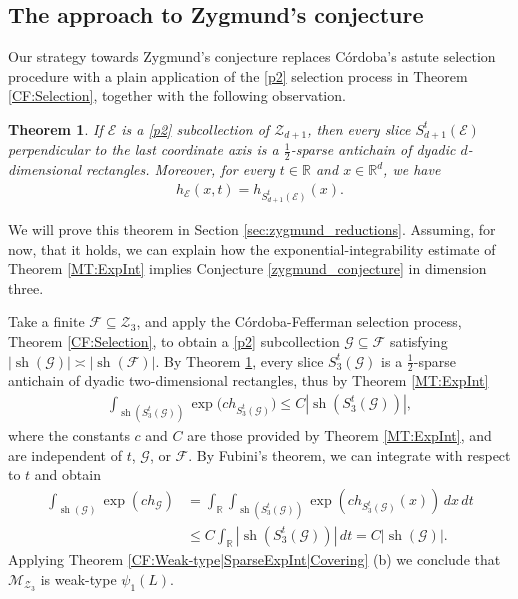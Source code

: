 \documentclass[oneside]{amsart}
\newtheorem{theorem}{Theorem}
\theoremstyle{definition}
\theoremstyle{plain}
\numberwithin{equation}{section}
\numberwithin{theorem}{section}
\newcommand{\sh}{\operatorname{sh}}
\begin{document}
\subsection{The approach to Zygmund's conjecture}

Our strategy towards Zygmund's conjecture replaces Córdoba's astute selection
procedure with a plain application of the \eqref{p2} selection process in
Theorem \ref{CF:Selection}, together with the following observation.
\begin{theorem} \label{slices_are_sparse_antichains}
  If $\mathcal{E}$ is a \eqref{p2} subcollection of $\mathcal{Z}_{d+1}$, then
  every slice $S_{d+1}^t(\mathcal{E})$ perpendicular to the last coordinate axis
  is a $\frac{1}{2}$-sparse antichain of dyadic $d$-dimensional rectangles.
  Moreover, for every $t \in \mathbb{R}$ and $x \in \mathbb{R}^d$,  we have
  \begin{align*}
    h_{\mathcal{E}}(x,t) = h_{S_{d+1}^t(\mathcal{E})}(x).
  \end{align*}
\end{theorem}

We will prove this theorem in Section \ref{sec:zygmund_reductions}.
Assuming, for now, that it holds, we can explain how the
exponential-integrability estimate of Theorem
\ref{MT:ExpInt} implies Conjecture
\ref{zygmund_conjecture} in dimension three.

Take a finite $\mathcal{F} \subseteq \mathcal{Z}_3$, and apply the
Córdoba-Fefferman selection process, Theorem \ref{CF:Selection}, to obtain a
\eqref{p2} subcollection $\mathcal{G} \subseteq \mathcal{F}$ satisfying
$|\sh(\mathcal{G})| \asymp |\sh(\mathcal{F})|$.
By Theorem \ref{slices_are_sparse_antichains}, every slice $S_3^t(\mathcal{G})$
is a $\frac{1}{2}$-sparse antichain of dyadic two-dimensional rectangles, thus
by Theorem \ref{MT:ExpInt}
\begin{align*}
  \int_{\sh(S_3^t(\mathcal{G}))} \exp\big( c h_{S_3^t(\mathcal{G})}\big)
    \leq C|\sh(S_3^t(\mathcal{G}))|,
\end{align*}
where the constants $c$ and $C$ are those provided by Theorem \ref{MT:ExpInt},
and are independent of $t$, $\mathcal{G}$, or $\mathcal{F}$.
By Fubini's theorem, we can integrate with respect to $t$ and obtain
\begin{align*}
  \int_{\sh(\mathcal{G})} \exp(ch_{\mathcal{G}})
  &= \int_{\mathbb{R}} \int_{\sh(S_3^t(\mathcal{G}))}
    \exp(c h_{S_3^t(\mathcal{G})}(x)) \, dx \, dt \\
  &\leq C \int_{\mathbb{R}} |\sh(S_3^t(\mathcal{G}))| \, dt
  = C|\sh(\mathcal{G})|.
\end{align*}
Applying Theorem \ref{CF:Weak-type|SparseExpInt|Covering} (b) we conclude that
$\mathcal{M}_{\mathcal{Z}_3}$ is weak-type $\psi_1(L)$.
\end{document}
